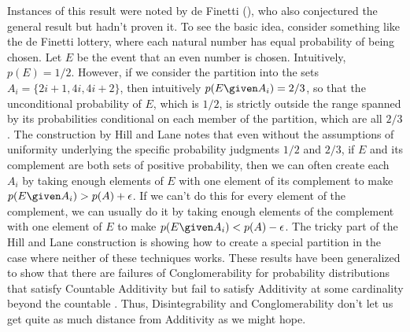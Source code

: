 Instances of this result were noted by de Finetti (\citeyear[pp.\ 177--8]{definetti}), who also conjectured the general result but hadn't proven it. To see the basic idea, consider something like the de Finetti lottery, where each natural number has equal probability of being chosen. Let $E$ be the event that an even number is chosen. Intuitively, $p(E)=1/2$. However, if we consider the partition into the sets $A_i=\{2i+1, 4i, 4i+2\}$, then intuitively $p(E \given A_i)=2/3$, so that the unconditional probability of $E$, which is $1/2$, is strictly outside the range spanned by its probabilities conditional on each member of the partition, which are all $2/3$. The construction by Hill and Lane notes that even without the assumptions of uniformity underlying the specific probability judgments $1/2$ and $2/3$, if $E$ and its complement are both sets of positive probability, then we can often create each $A_i$ by taking enough elements of $E$ with one element of its complement to make $p(E \given A_i)>p(A)+\epsilon$. If we can't do this for every element of the complement, we can usually do it by taking enough elements of the complement with one element of $E$ to make $p(E \given A_i)<p(A)-\epsilon$. The tricky part of the Hill and Lane construction is showing how to create a special partition in the case where neither of these techniques works. These results have been generalized to show that there are failures of Conglomerability for probability distributions that satisfy Countable Additivity but fail to satisfy Additivity at some cardinality beyond the countable \citep{sskkappa, nonkappa}. %
Thus, Disintegrability and Conglomerability don't let us get quite as much distance from Additivity as we might hope.

